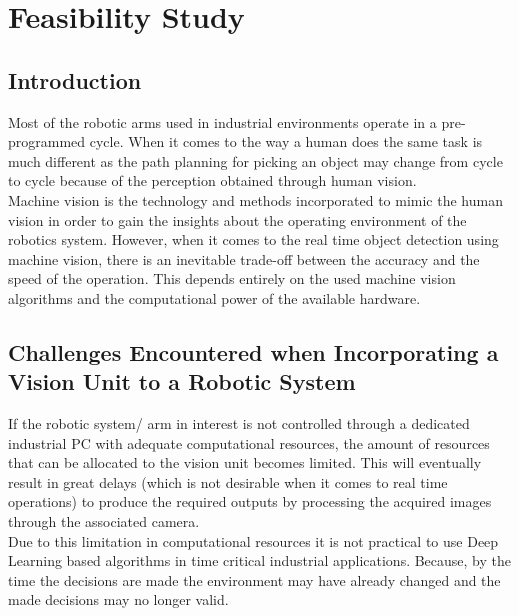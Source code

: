 \documentclass[a4paper,12pt]{book}%
\begin{document}

\tableofcontents





\chapter{Feasibility Study}
\section{Introduction}
Most of the robotic arms used in industrial environments operate in a pre-programmed cycle. When it comes to the way a human does the same task is much different as the path planning for picking an object may change from cycle to cycle because of the perception obtained through human vision.\\

Machine vision is the technology and methods incorporated to mimic the human vision in order to gain the insights about the operating environment of the robotics system. However, when it comes to the real time object detection using machine vision, there is an inevitable trade-off between the accuracy and the speed of the operation. This depends entirely on the used machine vision algorithms and the computational power of the available hardware.

\section{Challenges Encountered when Incorporating  a Vision Unit to a Robotic System}

If the robotic system/ arm in interest is not controlled through a dedicated industrial PC with adequate computational resources, the amount of resources that can be allocated to the vision unit becomes limited.  This will eventually result in great delays (which is not desirable when it comes to real time operations) to produce the required outputs by processing the acquired images through the associated camera.\\

Due to this limitation in computational resources it is not practical to use Deep Learning based algorithms in time critical industrial applications. Because, by the time the decisions are made the environment may have already changed and the made decisions may no longer valid.
\end{document}
